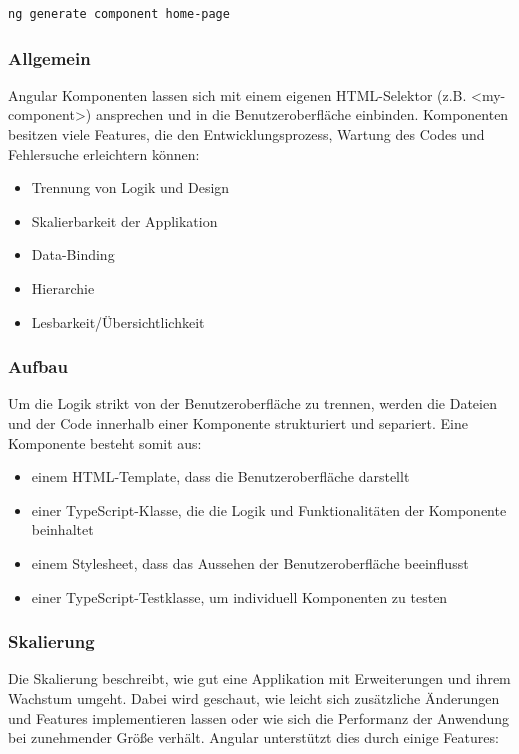 \begin{lstlisting}[caption={{Terminal - Component erstellen}},language=bash,label=lst:impl:addComponent]
    ng generate component home-page
\end{lstlisting}

\subsubsection{Allgemein}
Angular Komponenten lassen sich mit einem eigenen HTML-Selektor (z.B. <my-component>) ansprechen und in die Benutzeroberfläche einbinden. Komponenten besitzen viele Features, die den Entwicklungsprozess, Wartung des Codes und Fehlersuche erleichtern können:

\begin{itemize}
    \item Trennung von Logik und Design
    \item Skalierbarkeit der Applikation
    \item Data-Binding
    \item Hierarchie
    \item Lesbarkeit/Übersichtlichkeit
\end{itemize}

\subsubsection{Aufbau}
Um die Logik strikt von der Benutzeroberfläche zu trennen, werden die Dateien und der Code innerhalb einer Komponente strukturiert und separiert. Eine Komponente besteht somit aus: 

\begin{itemize}
    \item einem HTML-Template, dass die Benutzeroberfläche darstellt
    \item einer TypeScript-Klasse, die die Logik und Funktionalitäten der Komponente beinhaltet
    \item einem Stylesheet, dass das Aussehen der Benutzeroberfläche beeinflusst
    \item einer TypeScript-Testklasse, um individuell Komponenten zu testen 
\end{itemize}

\cite{AngularComponentOverview}

\subsubsection{Skalierung}
Die Skalierung beschreibt, wie gut eine Applikation mit Erweiterungen und ihrem Wachstum umgeht. Dabei wird geschaut, wie leicht sich zusätzliche Änderungen und Features implementieren lassen oder wie sich die Performanz der Anwendung bei zunehmender Größe verhält. Angular unterstützt dies durch einige Features:

